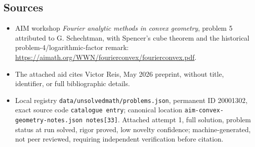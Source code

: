 \documentclass[11pt]{article}
\begin{document}
\subsection{Sources}
\begin{itemize}
\item AIM workshop \emph{Fourier analytic methods in convex geometry}, problem 5 attributed to G. Schechtman, with Spencer's cube theorem and the historical problem-4/logarithmic-factor remark: \url{https://aimath.org/WWN/fourierconvex/fourierconvex.pdf}.
\item The attached aid cites Victor Reis, May 2026 preprint, without title, identifier, or full bibliographic details.
\item Local registry \texttt{data/unsolvedmath/problems.json}, permanent ID 20001302, exact source code \texttt{catalogue entry}; canonical location \texttt{aim-convex-geometry-notes.json notes[33]}. Attached attempt 1, full solution, problem status at run solved, rigor proved, low novelty confidence; machine-generated, not peer reviewed, requiring independent verification before citation.
\end{itemize}
\end{document}
